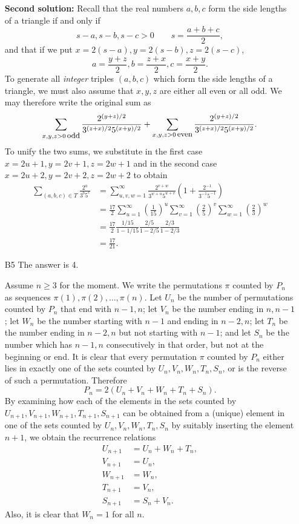 \documentclass[amssymb,twocolumn,pra,10pt,aps]{revtex4-1}
\begin{document}
\begin{itemize}
\noindent
\textbf{Second solution:}
Recall that the real numbers $a,b,c$ form the side lengths of a triangle if and only if
\[
s-a, s-b, s-c > 0 \qquad s = \frac{a+b+c}{2},
\]
and that if we put $x = 2(s-a), y = 2(s-b), z = 2(s-c)$,
\[
a = \frac{y+z}{2}, b = \frac{z+x}{2}, c = \frac{x+y}{2}.
\]
To generate all \emph{integer} triples $(a,b,c)$ which form the side lengths of a triangle, we must also assume that $x,y,z$ are either all even or all odd. We may therefore write the original sum as
\[
\sum_{x,y,z >0 \mbox{\small \,odd}} \frac{2^{(y+z)/2}}{3^{(z+x)/2} 5^{(x+y)/2}}
+ \sum_{x,y,z >0 \mbox{\small \,even}} \frac{2^{(y+z)/2}}{3^{(z+x)/2} 5^{(x+y)/2}}.
\]
To unify the two sums, we substitute in the first case  $x = 2u+1, y = 2v+1, z = 2w+1$ and in the second case $x = 2u+2, y = 2v+2, z = 2w+2$ to obtain
\begin{align*}
\sum_{(a,b,c) \in T} \frac{2^a}{3^b 5^c}
&= \sum_{u,v,w=1}^\infty \frac{2^{v+w}}{3^{w+u} 5^{u+v}} \left( 1 + \frac{2^{-1}}{3^{-1} 5^{-1}} \right) \\
&= \frac{17}{2} \sum_{u=1}^\infty \left( \frac{1}{15} \right)^u \sum_{v=1}^\infty
\left( \frac{2}{5} \right)^v \sum_{w=1}^\infty \left( \frac{2}{3} \right)^w \\
&= \frac{17}{2} \frac{1/15}{1-1/15} \frac{2/5}{1-2/5} \frac{2/3}{1-2/3} \\
&= \frac{17}{21}.
\end{align*}

\item[B5]
The answer is 4.

Assume $n \geq 3$ for the moment.
We write the permutations $\pi$ counted by $P_n$ as sequences $\pi(1),\pi(2),\ldots,\pi(n)$.  Let $U_n$ be the number of permutations counted by $P_n$ that end with $n-1,n$; let $V_n$ be the number ending in $n,n-1$; let $W_n$ be the number starting with $n-1$ and ending in $n-2,n$; let $T_n$ be the number ending in $n-2,n$ but not starting with $n-1$; and let $S_n$ be the number which has $n-1,n$ consecutively in that order, but not at the beginning or end.
It is clear that every permutation $\pi$ counted by $P_n$ either lies in exactly one of the sets counted by $U_n, V_n, W_n, T_n, S_n$, or is the reverse of such a permutation.  Therefore
\[
P_n = 2 (U_n + V_n + W_n+ T_n+ S_n).
\]
By examining how each of the elements in the sets counted by $U_{n+1}, V_{n+1}, W_{n+1}, T_{n+1}, S_{n+1}$ can be obtained from a (unique) element in one of the sets counted by $U_n, V_n, W_n, T_n, S_n$ by suitably inserting the element $n+1$, we obtain the recurrence relations
\begin{align*}
U_{n+1} &= U_n+W_n+T_n, \\
V_{n+1}&=U_n, \\
W_{n+1}&=W_n, \\
T_{n+1}&=V_n, \\
S_{n+1}&=S_n+V_n.
\end{align*}
Also, it is clear that $W_n=1$ for all $n$. 


\end{itemize}
\end{document}
